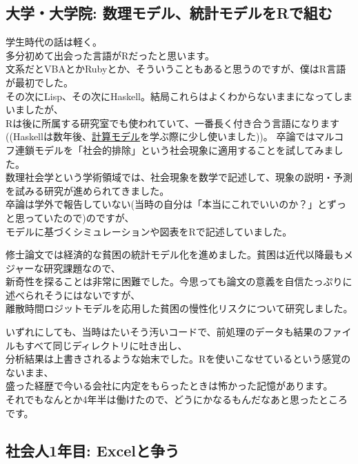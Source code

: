 \documentclass[
  letterpaper,
  DIV=11,
  numbers=noendperiod]{scrartcl}
\begin{document}
\hypertarget{ux5927ux5b66ux5927ux5b66ux9662-ux6570ux7406ux30e2ux30c7ux30ebux7d71ux8a08ux30e2ux30c7ux30ebux3092rux3067ux7d44ux3080}{%
\subsection{大学・大学院:
数理モデル、統計モデルをRで組む}\label{ux5927ux5b66ux5927ux5b66ux9662-ux6570ux7406ux30e2ux30c7ux30ebux7d71ux8a08ux30e2ux30c7ux30ebux3092rux3067ux7d44ux3080}}

学生時代の話は軽く。\\
多分初めて出会った言語がRだったと思います。\\
文系だとVBAとかRubyとか、そういうこともあると思うのですが、僕はR言語が最初でした。\\
その次にLisp、その次にHaskell。結局これらはよくわからないままになってしまいましたが、\\
Rは後に所属する研究室でも使われていて、一番長く付き合う言語になります((Haskellは数年後、\href{https://www.morikita.co.jp/books/mid/085471}{計算モデル}を学ぶ際に少し使いました))。
卒論ではマルコフ連鎖モデルを「社会的排除」という社会現象に適用することを試してみました。\\
数理社会学という学術領域では、社会現象を数学で記述して、現象の説明・予測を試みる研究が進められてきました。\\
卒論は学外で報告していない(当時の自分は「本当にこれでいいのか？」とずっと思っていたので)のですが、\\
モデルに基づくシミュレーションや図表をRで記述していました。

修士論文では経済的な貧困の統計モデル化を進めました。貧困は近代以降最もメジャーな研究課題なので、\\
新奇性を探ることは非常に困難でした。今思っても論文の意義を自信たっぷりに述べられそうにはないですが、\\
離散時間ロジットモデルを応用した貧困の慢性化リスクについて研究しました。

いずれにしても、当時はたいそう汚いコードで、前処理のデータも結果のファイルもすべて同じディレクトリに吐き出し、\\
分析結果は上書きされるような始末でした。Rを使いこなせているという感覚のないまま、\\
盛った経歴で今いる会社に内定をもらったときは怖かった記憶があります。\\
それでもなんとか4年半は働けたので、どうにかなるもんだなあと思ったところです。

\hypertarget{ux793eux4f1aux4eba1ux5e74ux76ee-excelux3068ux4e89ux3046}{%
\subsection{社会人1年目:
Excelと争う}\label{ux793eux4f1aux4eba1ux5e74ux76ee-excelux3068ux4e89ux3046}}
\end{document}
